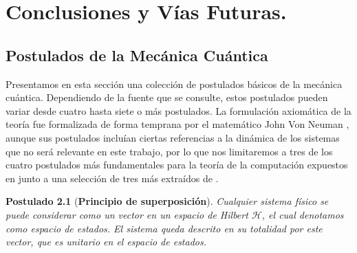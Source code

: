 \documentclass[11pt, spanish]{report}
\numberwithin{equation}{section}
\newtheorem{postu}{Postulado}
\numberwithin{defin}{section}
\begin{document}
\chapter{Conclusiones y Vías Futuras.}

%
%
%

\begin{appendices}


\chapter[Postulados de la Mecánica Cuántica]{Postulados de la Mecánica Cuántica\raisebox{.3\baselineskip}{\normalsize\footnotemark}}\label{Postulados}


Presentamos en esta sección una colección de postulados básicos de la mecánica cuántica. Dependiendo de la fuente que se consulte, estos postulados pueden variar desde cuatro hasta siete o más postulados. La formulación axiomática de la teoría fue formalizada de forma temprana por el matemático John Von Neuman \small{\cite{von2018mathematical}}, aunque sus postulados incluían ciertas referencias a la dinámica de los sistemas que no será relevante en este trabajo, por lo que nos limitaremos a tres de los cuatro postulados más fundamentales para la teoría de la computación expuestos en \small{\cite{nielsen2002quantum}} junto a una selección de tres más extraídos de \small{\cite{postus}}.

\begin{postu}[\textbf{Principio de superposición}]\label{post:hilbert} Cualquier sistema físico se puede considerar como un vector en un espacio de Hilbert $\mathcal{H}$, el cual denotamos como \emph{espacio de estados}. El sistema queda descrito en su totalidad por este vector, que es unitario en el espacio de estados.
\end{postu}


\end{appendices}
\end{document}
